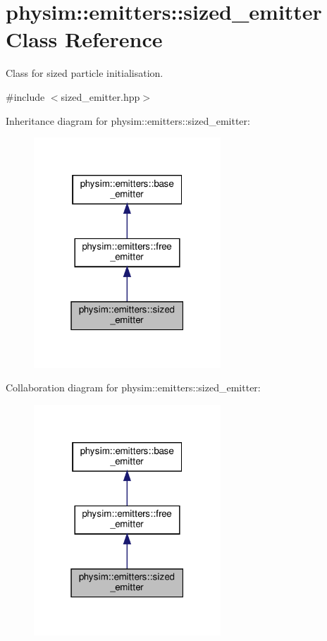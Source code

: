 \hypertarget{classphysim_1_1emitters_1_1sized__emitter}{}\section{physim\+:\+:emitters\+:\+:sized\+\_\+emitter Class Reference}
\label{classphysim_1_1emitters_1_1sized__emitter}


Class for sized particle initialisation.  




{\ttfamily \#include $<$sized\+\_\+emitter.\+hpp$>$}



Inheritance diagram for physim\+:\+:emitters\+:\+:sized\+\_\+emitter\+:\nopagebreak
\begin{figure}[H]
\begin{center}
\leavevmode
\includegraphics[width=199pt]{classphysim_1_1emitters_1_1sized__emitter__inherit__graph}
\end{center}
\end{figure}


Collaboration diagram for physim\+:\+:emitters\+:\+:sized\+\_\+emitter\+:\nopagebreak
\begin{figure}[H]
\begin{center}
\leavevmode
\includegraphics[width=199pt]{classphysim_1_1emitters_1_1sized__emitter__coll__graph}
\end{center}
\end{figure}
